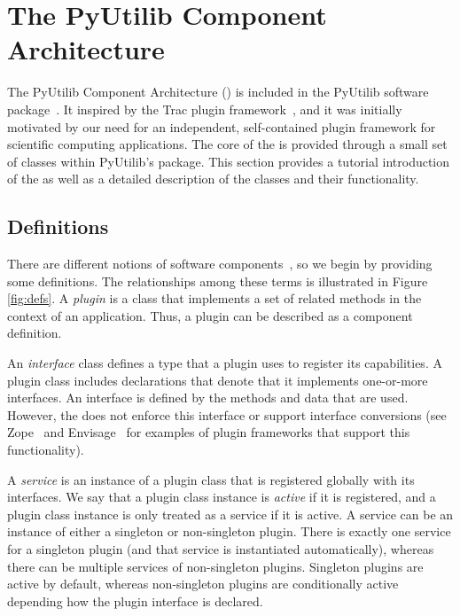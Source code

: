 
\section{The PyUtilib Component Architecture}

\label{chap:pca}

The PyUtilib Component Architecture (\pca) is included in the
PyUtilib software package~\cite{PyUtilib}.  It inspired by the Trac
plugin framework~\cite{Trac}, and it was initially motivated by our
need for an independent, self-contained plugin framework for
scientific computing applications.  The core of the \pcasp is
provided through a small set of classes within PyUtilib's
 package.  This section provides a
tutorial introduction of the \pcasp as well as a detailed description
of the \pcasp classes and their functionality.


\subsection{\pcasp Definitions}

There are different notions of software components~\cite{Mar05}, so we begin by
providing some definitions.  The relationships among these terms is
illustrated in Figure \ref{fig:defs}.  A \textit{plugin} is a
class that implements a set of related methods in the context of an
application.  Thus, a plugin can be described as a component definition.

An \textit{interface} class defines a type that a plugin uses to register
its capabilities.  A plugin class includes declarations that denote that
it implements one-or-more interfaces. An interface is defined by the
methods and data that are used.  However, the \pcasp does not enforce
this interface or support interface conversions (see Zope~\cite{Zope}
and Envisage~\cite{Envisage} for examples of plugin frameworks that
support this functionality).

A \textit{service} is an instance of a plugin class that is registered
globally with its interfaces.  We say that a plugin class instance
is \textit{active} if it is registered, and a plugin class instance
is only treated as a service if it is active.  A service can be an
instance of either a singleton or non-singleton plugin. There is
exactly one service for a singleton plugin (and that service is
instantiated automatically), whereas there can be multiple services
of non-singleton plugins.  Singleton plugins are active by default,
whereas non-singleton plugins are conditionally active depending
how the plugin interface is declared.

